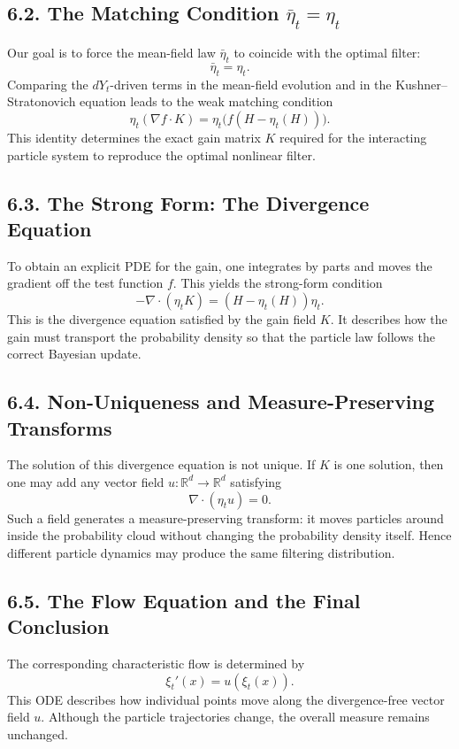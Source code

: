 \documentclass[11pt]{article}
\theoremstyle{definition}
\theoremstyle{remark}
\begin{document}
\subsection*{6.2. The Matching Condition \(\bar\eta_t=\eta_t\)}
Our goal is to force the mean-field law \(\bar\eta_t\) to coincide with the optimal filter:
\[
\bar\eta_t=\eta_t.
\]
Comparing the \(dY_t\)-driven terms in the mean-field evolution and in the Kushner--Stratonovich equation leads to the weak matching condition
\[
\eta_t(\nabla f\cdot K)=\eta_t\bigl(f(H-\eta_t(H))\bigr).
\]
This identity determines the exact gain matrix \(K\) required for the interacting particle system to reproduce the optimal nonlinear filter.

\subsection*{6.3. The Strong Form: The Divergence Equation}
To obtain an explicit PDE for the gain, one integrates by parts and moves the gradient off the test function \(f\). This yields the strong-form condition
\[
-\nabla\cdot(\eta_t K)
=(H-\eta_t(H))\eta_t.
\]
This is the divergence equation satisfied by the gain field \(K\). It describes how the gain must transport the probability density so that the particle law follows the correct Bayesian update.

\subsection*{6.4. Non-Uniqueness and Measure-Preserving Transforms}
The solution of this divergence equation is not unique. If \(K\) is one solution, then one may add any vector field \(u:\mathbb R^d\to\mathbb R^d\) satisfying
\[
\nabla\cdot(\eta_t u)=0.
\]
Such a field generates a measure-preserving transform: it moves particles around inside the probability cloud without changing the probability density itself. Hence different particle dynamics may produce the same filtering distribution.

\subsection*{6.5. The Flow Equation and the Final Conclusion}
The corresponding characteristic flow is determined by
\[
\xi_t'(x)=u(\xi_t(x)).
\]
This ODE describes how individual points move along the divergence-free vector field \(u\). Although the particle trajectories change, the overall measure remains unchanged.
\end{document}
